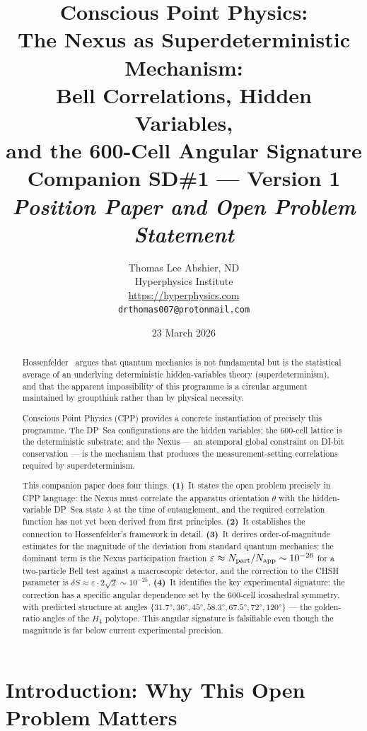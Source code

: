 \documentclass[11pt,a4paper]{article}
\title{\textbf{Conscious Point Physics:\\
The Nexus as Superdeterministic Mechanism:\\
Bell Correlations, Hidden Variables,\\
and the 600-Cell Angular Signature}\\[6pt]
{\large Companion SD\#1 --- Version 1}\\[4pt]
{\normalsize \textit{Position Paper and Open Problem Statement}}}
\author{Thomas Lee Abshier, ND\\
Hyperphysics Institute\\
\url{https://hyperphysics.com}\\
\texttt{drthomas007@protonmail.com}}
\date{23 March 2026}
\newcommand{\eps}{\varepsilon}
\begin{document}
\maketitle

\begin{abstract}
Hossenfelder~\citep{hossenfelder2024} argues that quantum mechanics is
not fundamental but is the statistical average of an underlying
deterministic hidden-variables theory (superdeterminism), and that
the apparent impossibility of this programme is a circular argument
maintained by groupthink rather than by physical necessity.

Conscious Point Physics (CPP) provides a concrete instantiation of
precisely this programme.  The DP~Sea configurations are the hidden
variables; the 600-cell lattice is the deterministic substrate; and
the Nexus --- an atemporal global constraint on DI-bit conservation ---
is the mechanism that produces the measurement-setting correlations
required by superdeterminism.

This companion paper does four things.
\textbf{(1)}~It states the open problem precisely in CPP language: the
Nexus must correlate the apparatus orientation $\theta$ with the
hidden-variable DP~Sea state $\lambda$ at the time of entanglement,
and the required correlation function has not yet been derived from
first principles.
\textbf{(2)}~It establishes the connection to Hossenfelder's
framework in detail.
\textbf{(3)}~It derives order-of-magnitude estimates for the magnitude
of the deviation from standard quantum mechanics: the dominant term
is the Nexus participation fraction $\eps \approx N_{\rm part} /
N_{\rm app} \sim 10^{-26}$ for a two-particle Bell test against a
macroscopic detector, and the correction to the CHSH parameter is
$\delta S \approx \eps \cdot 2\sqrt{2} \sim 10^{-25}$.
\textbf{(4)}~It identifies the key experimental signature: the
correction has a specific angular dependence set by the 600-cell
icosahedral symmetry, with predicted structure at angles
$\{31.7°, 36°, 45°, 58.3°, 67.5°, 72°, 120°\}$ --- the
golden-ratio angles of the $H_4$ polytope.  This angular signature
is falsifiable even though the magnitude is far below current
experimental precision.
\end{abstract}

\tableofcontents
\newpage

\section{Introduction: Why This Open Problem Matters}
\end{document}
